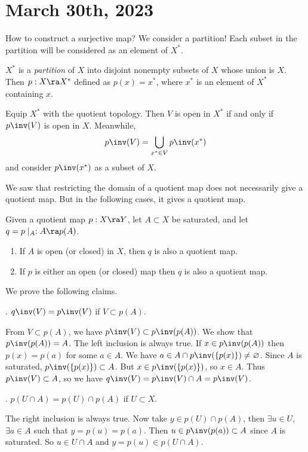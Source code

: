 \section*{March 30th, 2023}

How to construct a surjective map? We consider a partition! Each subset in the partition will be considered as an element of \(X^*\).

\(X^*\) is a \textit{partition} of \(X\) into disjoint nonempty subsets of \(X\) whose union is \(X\). Then \(p: X \ra X^*\) defined as \(p(x) = x^*\), where \(x^*\) is an element of \(X^*\) containing \(x\).

Equip \(X^*\) with the quotient topology. Then \(V\) is open in \(X^*\) if and only if \(p\inv(V)\) is open in \(X\). Meanwhile,
\[
    p\inv(V) = \bigcup_{x^* \in V} p\inv(x^*)
\]
and consider \(p\inv(x^*)\)  as a subset of \(X\).

We saw that restricting the domain of a quotient map does not necessarily give a quotient map. But in the following cases, it gives a quotient map.

 Given a quotient map \(p : X \ra Y\), let \(A \subset X\) be saturated, and let \(q = p \mid_A : A \ra p(A)\).
\begin{enumerate}
    \item If \(A\) is open (or closed) in \(X\), then \(q\) is also a quotient map.
    \item If \(p\) is either an open (or closed) map then \(q\) is also a quotient map.
\end{enumerate}

\pf We prove the following claims.

\quad \claim. \(q\inv(V) = p\inv(V)\) if \(V \subset p(A)\).

\quad \pf From \(V \subset p(A)\), we have \(p\inv(V) \subset p\inv(p(A))\). We show that \(p\inv(p(A)) = A\). The left inclusion is always true. If \(x \in p\inv(p(A))\) then \(p(x) = p(a)\) for some \(a \in A\). We have \(a \in A \cap p\inv(\{p(x)\}) \neq \varnothing\). Since \(A\) is saturated, \(p\inv(\{p(x)\}) \subset A\). But \(x \in p\inv(\{p(x)\})\), so \(x \in A\). Thus \(p\inv(V) \subset A\), so we have \(q\inv(V) = p\inv(V) \cap A = p\inv(V)\).

\quad \claim. \(p(U \cap A) = p(U) \cap p(A)\) if \(U \subset X\).

\quad \pf The right inclusion is always true. Now take \(y \in p(U) \cap p(A)\), then \(\exists u \in U\), \(\exists a \in A\) such that \(y = p(u) = p(a)\). Then \(u \in p\inv(p(a)) \subset A\) since \(A\) is saturated. So \(u \in U \cap A\) and \(y = p(u) \in p(U\cap A)\).


